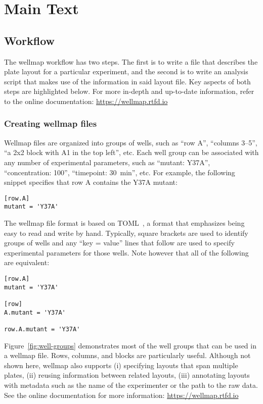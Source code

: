 \documentclass{bmcart}
\begin{document}
\section*{Main Text}

\subsection*{Workflow}

The wellmap workflow has two steps. The first is to write a file that describes the plate layout for a particular experiment, and the second is to write an analysis script that makes use of the information in said layout file. Key aspects of both steps are highlighted below. For more in-depth and up-to-date information, refer to the online documentation: \url{https://wellmap.rtfd.io} 

\subsubsection*{Creating wellmap files}

Wellmap files are organized into groups of wells, such as ``row A'', ``columns 3--5'', ``a 2x2 block with A1 in the top left'', etc. Each well group can be associated with any number of experimental parameters, such as ``mutant: Y37A'', ``concentration: \SI{100}{\ugmL}'', ``timepoint: \SI{30}{\minute}'', etc. For example, the following snippet specifies that row A contains the Y37A mutant:

\begin{lstlisting}
[row.A]
mutant = 'Y37A'
\end{lstlisting}

The wellmap file format is based on TOML~\cite{preston-werner2020}, a format that emphasizes being easy to read and write by hand. Typically, square brackets are used to identify groups of wells and any ``key = value'' lines that follow are used to specify experimental parameters for those wells. Note however that all of the following are equivalent:

\begin{lstlisting}
[row.A]
mutant = 'Y37A'

[row]
A.mutant = 'Y37A'

row.A.mutant = 'Y37A'
\end{lstlisting}

Figure~\ref{fig:well-groups} demonstrates most of the well groups that can be used in a wellmap file. Rows, columns, and blocks are particularly useful. Although not shown here, wellmap also supports (i) specifying layouts that span multiple plates, (ii) reusing information between related layouts, (iii) annotating layouts with metadata such as the name of the experimenter or the path to the raw data. See the online documentation for more information: \url{https://wellmap.rtfd.io}
\end{document}
